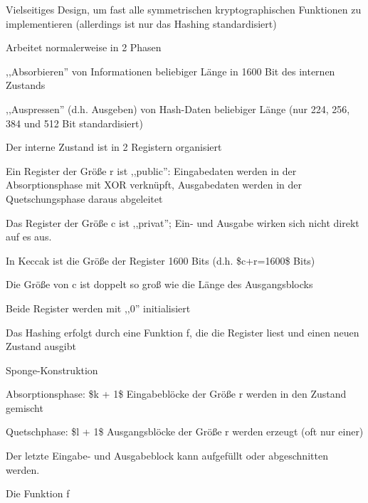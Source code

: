 \documentclass[a4paper]{article}
\begin{document}
\begin{multicols}{3}
\begin{itemize*}
            \begin{itemize*}
                  \item Vielseitiges Design, um fast alle symmetrischen kryptographischen Funktionen zu implementieren (allerdings ist nur das Hashing standardisiert)
            \end{itemize*}
            \item
            Arbeitet normalerweise in 2 Phasen

            \begin{itemize*}
                  \item ,,Absorbieren'' von Informationen beliebiger Länge in 1600 Bit des internen Zustands
                  \item ,,Auspressen'' (d.h. Ausgeben) von Hash-Daten beliebiger Länge (nur 224, 256, 384 und 512 Bit standardisiert)
            \end{itemize*}
            \item
            Der interne Zustand ist in 2 Registern organisiert

            \begin{itemize*}
                  \item Ein Register der Größe r ist ,,public'': Eingabedaten werden in der Absorptionsphase mit XOR verknüpft, Ausgabedaten werden in der Quetschungsphase daraus abgeleitet
                  \item Das Register der Größe c ist ,,privat''; Ein- und Ausgabe wirken sich nicht direkt auf es aus.
                  \item In Keccak ist die Größe der Register 1600 Bits (d.h. \$c+r=1600\$ Bits)
                  \item Die Größe von c ist doppelt so groß wie die Länge des Ausgangsblocks
                  \item Beide Register werden mit ,,0'' initialisiert
            \end{itemize*}
            \item
            Das Hashing erfolgt durch eine Funktion f, die die Register liest und
            einen neuen Zustand ausgibt
            \item
            Sponge-Konstruktion

            \begin{itemize*}
                  \item Absorptionsphase: \$k + 1\$ Eingabeblöcke der Größe r werden in den Zustand gemischt
                  \item Quetschphase: \$l + 1\$ Ausgangsblöcke der Größe r werden erzeugt (oft nur einer)
                  \item Der letzte Eingabe- und Ausgabeblock kann aufgefüllt oder abgeschnitten werden.
            \end{itemize*}
            \item
            Die Funktion f


\end{itemize*}
\end{multicols}
\end{document}
